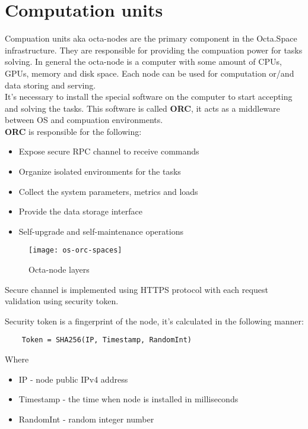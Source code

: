 \section{Computation units}

Compuation units aka octa-nodes are the primary component in the Octa.Space infrastructure.
They are responsible for providing the compuation power for tasks solving.
In general the octa-node is a computer with some amount of CPUs, GPUs, memory and disk space.
Each node can be used for computation or/and data storing and serving.
\\

It's necessary to install the special software on the computer to start accepting and solving the tasks.
This software is called \textbf{ORC}, it acts as a middleware between OS and compuation environments.
\\

\textbf{ORC} is responsible for the following:

\begin{itemize}
    \item Expose secure RPC channel to receive commands
    \item Organize isolated environments for the tasks
    \item Collect the system parameters, metrics and loads
    \item Provide the data storage interface
    \item Self-upgrade and self-maintenance operations
\end{itemize}

\begin{figure}[h]
\centering
\texttt{[image: os-orc-spaces]}
\caption{Octa-node layers}
\end{figure}

Secure channel is implemented using HTTPS\cite{https} protocol with each request validation using security token.

Security token is a fingerprint of the node, it's calculated in the following manner:

\begin{verbatim}
    Token = SHA256(IP, Timestamp, RandomInt)
\end{verbatim}

Where

\begin{itemize}
    \item IP - node public IPv4 address
    \item Timestamp - the time when node is installed in milliseconds
    \item RandomInt - random integer number
\end{itemize}

